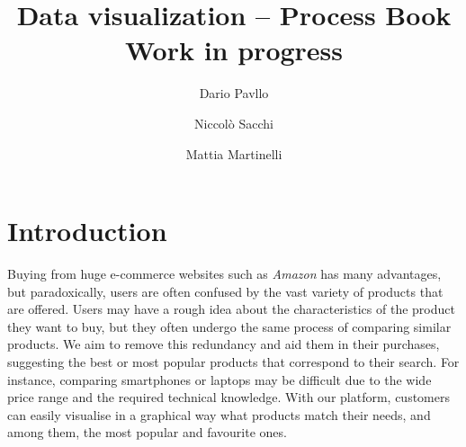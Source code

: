 \documentclass[a4paper,12pt]{article}
\title{Data visualization -- Process Book\\\textbf{Work in progress}}
\author{Dario Pavllo \and Niccolò Sacchi \and Mattia Martinelli}
\date{} %
\begin{document}
\maketitle
\section{Introduction}
Buying from huge e-commerce websites such as \emph{Amazon} has many advantages, but paradoxically, users are often confused by the vast variety of products that are offered. Users may have a rough idea about the characteristics of the product they want to buy, but they often undergo the same process of comparing similar products. We aim to remove this redundancy and aid them in their purchases, suggesting the best or most popular products that correspond to their search. For instance, comparing smartphones or laptops may be difficult due to the wide price range and the required technical knowledge. With our platform, customers can easily visualise in a graphical way what products match their needs, and among them, the most popular and favourite ones.
\end{document}
